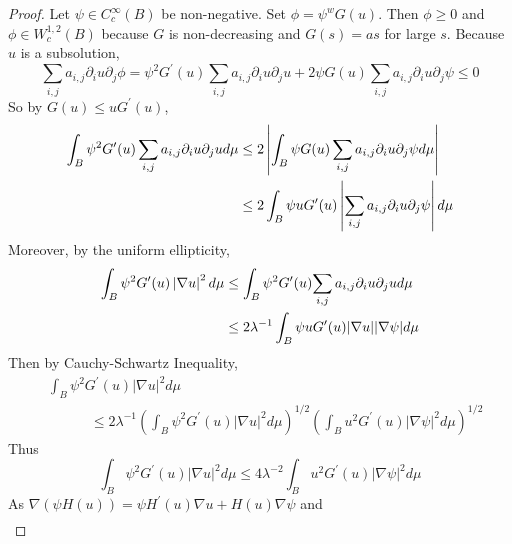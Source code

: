 \begin{enumerate}[label=\Roman*.]
\begin{proof}
		\noindent Let $\psi \in C_c^\infty(B)$ be non-negative. Set $\phi = \psi^wG(u)$. Then $\phi \geq 0$ and $\phi \in W^{1,2}_c(B)$ because $G$ is non-decreasing and $G(s) = as$ for large $s$. Because $u$ is a subsolution,
		\begin{equation*}
			\sum_{i, j} a_{i, j} \partial_i u \partial_j \phi=\psi^2 G^{\prime}(u) \sum_{i, j} a_{i, j} \partial_i u \partial_j u+2 \psi G(u) \sum_{i, j} a_{i, j} \partial_i u \partial_j \psi \leq 0
		\end{equation*}
		So by $G(u) \leq u G^{\prime}(u)$,
		\begin{equation*}
			\begin{aligned}
				\int_B \psi^2 G^{\prime}(u) \sum_{i, j} a_{i, j} \partial_i u \partial_j u d \mu &\leq 2\left\lvert\int_B \psi G(u) \sum_{i, j} a_{i, j} \partial_i u \partial_j \psi d \mu\right\lvert \\
				&\leq 2\int_B \psi uG^\prime(u) \left\lvert\sum_{i, j} a_{i, j} \partial_i u \partial_j \psi\right\lvert d \mu
			\end{aligned}
		\end{equation*}
		Moreover, by the uniform ellipticity,
		\begin{equation*}
			\begin{aligned}
				\int_B \psi^2 G^{\prime}(u) \left\lvert\nabla u\right\lvert^2 d \mu &\leq \int_B \psi^2 G^{\prime}(u) {\sum_{i, j} a_{i, j} \partial_i u \partial_j u} d \mu \\
				&\leq 2 \lambda^{-1}\int_B \psi u G^{\prime}(u)|\nabla u||\nabla \psi| d \mu
			\end{aligned}
		\end{equation*}
		Then by Cauchy-Schwartz Inequality,
		\begin{equation*}
			\begin{aligned}
				& \int_B \psi^2 G^{\prime}(u)|\nabla u|^2 d \mu \\
				& \qquad \quad \leq 2 \lambda^{-1}\left(\int_B \psi^2 G^{\prime}(u)|\nabla u|^2 d \mu\right)^{1 / 2}\left(\int_B u^2 G^{\prime}(u)|\nabla \psi|^2 d \mu\right)^{1 / 2}
			\end{aligned}
		\end{equation*}
		Thus
		\begin{equation*}
			\int_B \psi^2 G^{\prime}(u)|\nabla u|^2 d \mu \leq 4 \lambda^{-2} \int_B u^2 G^{\prime}(u)|\nabla \psi|^2 d \mu
		\end{equation*}
		As $\nabla(\psi H(u))=\psi H^{\prime}(u) \nabla u+H(u) \nabla \psi$ and
		\begin{equation*}
			\begin{aligned}

\end{aligned}
\end{equation*}
\end{proof}
\end{enumerate}
